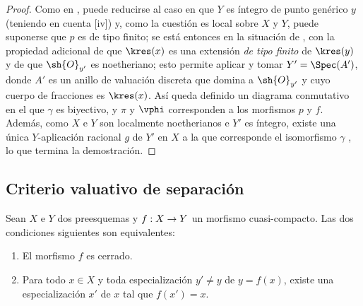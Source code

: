 \documentclass[oneside,10pt]{amsart}
\makeatletter
\newcommand{\ega@arrow}[2]{\mathchoice{#1}{#2}{#2}{#2}}
\renewcommand{\to}{\ega@arrow{\longrightarrow}{\rightarrow}}
\let\EGAOriginalLabel\label
\renewcommand{\label}[1]{\phantomsection\EGAOriginalLabel{#1}}
\makeatother
\begin{document}
\begin{proof}
Como en , puede reducirse al caso en que $Y$ es íntegro de punto genérico $y$ (teniendo en cuenta [iv]) y, como la cuestión es local sobre $X$ y $Y$, puede suponerse que $p$ es de tipo finito;
se está entonces en la situación de , con la propiedad adicional de que $\kres(x)$ es una extensión \emph{de tipo finito} de $\kres(y)$  y de que $\sh{O}_{y'}$ es noetheriano;
esto permite aplicar  y tomar $Y'=\Spec(A')$, donde $A'$ es un anillo de valuación discreta que domina a $\sh{O}_{y'}$ y cuyo cuerpo de fracciones es $\kres(x)$.
Así queda definido un diagrama conmutativo  en el que $\gamma$ es biyectivo, y $\pi$ y $\vphi$ corresponden a los morfismos $p$ y $f$.
Además, como $X$ e $Y$ son localmente noetherianos  e $Y'$ es íntegro, existe una única $Y$-aplicación racional $g$ de $Y'$ en $X$ a la que corresponde el isomorfismo $\gamma$ , lo que termina la demostración.
\end{proof}


\subsection{Criterio valuativo de separación}
\label{subsection:II.7.2}

\begin{proposition}[7.2.1]
\label{II.7.2.1}
Sean $X$ e $Y$ dos preesquemas y $f:X\to Y$ un morfismo cuasi-compacto.
Las dos condiciones siguientes son equivalentes:
\begin{enumerate}
  \item[\rm{(a)}] El morfismo $f$ es cerrado.
  \item[\rm{(b)}] Para todo $x\in X$ y toda especialización $y'\neq y$ de $y=f(x)$, existe una especialización $x'$ de $x$ tal que $f(x')=x$.
\end{enumerate}
\end{proposition}
\end{document}
